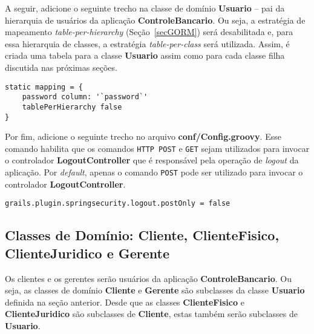 \vspace{0.5cm}

A seguir, adicione  o seguinte trecho na classe de domínio  {\bf Usuario} -- pai
da  hierarquia de  usuários  da  aplicação {\bf  ControleBancario}.  Ou seja,  a
estratégia  de mapeamento  {\it table-per-hierarchy}  (Seção~\ref{secGORM}) será
desabilitada   e,  para   essa  hierarquia   de  classes,   a   estratégia  {\it
  table-per-class} será  utilizada.  Assim,  é criada uma  tabela para  a classe
{\bf Usuario} assim como para cada classe filha discutida nas próximas seções.

\vspace{0.5cm}

\begin{cBox}
\begin{small}
\begin{verbatim}
static mapping = {
    password column: '`password`'
    tablePerHierarchy false
}
\end{verbatim}
\end{small}
\end{cBox}

\vspace{0.5cm}

Por fim,  adicione o seguinte  trecho no arquivo {\bf  conf/Config.groovy}. Esse
comando  habilita  que  os  comandos  \texttt{HTTP POST}  e  \texttt{GET}  sejam
utilizados para  invocar o controlador {\bf LogoutController}  que é responsável
pela operação de {\it logout} da  aplicação. Por {\it default}, apenas o comando
\texttt{POST}   pode   ser   utilizado   para   invocar   o   controlador   {\bf
  LogoutController}. 

\vspace{0.5cm}

\begin{cBox}
\begin{small}
\begin{verbatim}
grails.plugin.springsecurity.logout.postOnly = false
\end{verbatim}
\end{small}
\end{cBox}

\newpage

\subsection{Classes de Domínio: Cliente, ClienteFisico, ClienteJuridico e Gerente}

Os    clientes   e   os    gerentes   serão    usuários   da    aplicação   {\bf
  ControleBancario}.  Ou  seja, as  classes  de  domínio  {\bf Cliente}  e  {\bf
  Gerente}   são  subclasses  da   classe  {\bf   Usuario}  definida   na  seção
anterior. Desde que  as classes {\bf ClienteFisico} e  {\bf ClienteJuridico} são
subclasses de {\bf Cliente}, estas também serão subclasses de {\bf Usuario}.

